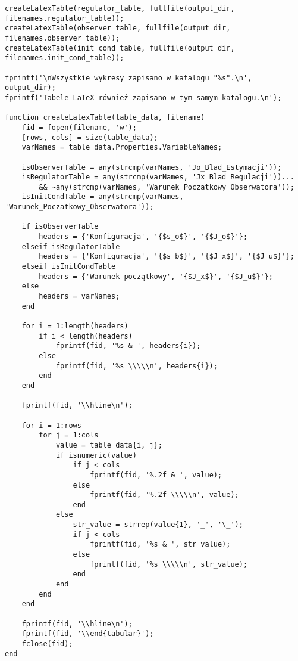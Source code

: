 \documentclass[a4paper,titlepage,11pt,floatssmall]{mwrep} %
\begin{document}
\begin{lstlisting}[style=custommatlab, caption={Pełny kod skryptu \texttt{combined\_plots.m}.}, label={lst:init_full}]
createLatexTable(regulator_table, fullfile(output_dir, filenames.regulator_table));
createLatexTable(observer_table, fullfile(output_dir, filenames.observer_table));
createLatexTable(init_cond_table, fullfile(output_dir, filenames.init_cond_table));

fprintf('\nWszystkie wykresy zapisano w katalogu "%s".\n', output_dir);
fprintf('Tabele LaTeX również zapisano w tym samym katalogu.\n');

function createLatexTable(table_data, filename)
    fid = fopen(filename, 'w');
    [rows, cols] = size(table_data);
    varNames = table_data.Properties.VariableNames;

    isObserverTable = any(strcmp(varNames, 'Jo_Blad_Estymacji'));
    isRegulatorTable = any(strcmp(varNames, 'Jx_Blad_Regulacji'))...
        && ~any(strcmp(varNames, 'Warunek_Poczatkowy_Obserwatora'));
    isInitCondTable = any(strcmp(varNames, 'Warunek_Poczatkowy_Obserwatora'));

    if isObserverTable
        headers = {'Konfiguracja', '{$s_o$}', '{$J_o$}'};
    elseif isRegulatorTable
        headers = {'Konfiguracja', '{$s_b$}', '{$J_x$}', '{$J_u$}'};
    elseif isInitCondTable
        headers = {'Warunek początkowy', '{$J_x$}', '{$J_u$}'};
    else
        headers = varNames;
    end

    for i = 1:length(headers)
        if i < length(headers)
            fprintf(fid, '%s & ', headers{i});
        else
            fprintf(fid, '%s \\\\\n', headers{i});
        end
    end

    fprintf(fid, '\\hline\n');

    for i = 1:rows
        for j = 1:cols
            value = table_data{i, j};
            if isnumeric(value)
                if j < cols
                    fprintf(fid, '%.2f & ', value);
                else
                    fprintf(fid, '%.2f \\\\\n', value);
                end
            else
                str_value = strrep(value{1}, '_', '\_');
                if j < cols
                    fprintf(fid, '%s & ', str_value);
                else
                    fprintf(fid, '%s \\\\\n', str_value);
                end
            end
        end
    end

    fprintf(fid, '\\hline\n');
    fprintf(fid, '\\end{tabular}');
    fclose(fid);
end


\end{lstlisting}
\end{document}
